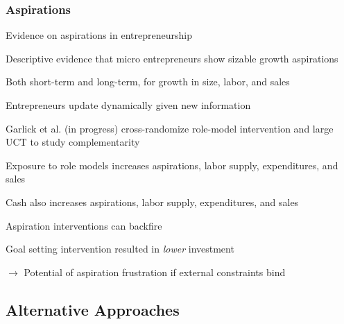 \documentclass[hideothersubsections, usenames,dvipsnames,11pt]{beamer}
\newenvironment{itemize_2pt}{\itemize\addtolength{\itemsep}{2pt}}{\enditemize}
\begin{document}
\begin{frame}
\frametitle{Aspirations}

Evidence on aspirations in entrepreneurship
\begin{itemize_2pt}
	\item Descriptive evidence that micro entrepreneurs show \textcolor{bdf}{sizable growth aspirations} \citep{Dalton2018}
	\begin{itemize_2pt}
		\item Both short-term and long-term, for growth in size, labor, and sales
		\item Entrepreneurs update dynamically given new information
	\end{itemize_2pt}
	
	\pause
	
	\item \textcolor{camel}{Garlick et al. (in progress)} cross-randomize role-model intervention and large UCT to study complementarity
	\begin{itemize_2pt}
		\item \textcolor{bdf}{Exposure to role models increases aspirations, labor supply, expenditures, and sales}
		\item Cash also increases aspirations, labor supply, expenditures, and sales
	\end{itemize_2pt}
	
	\pause
	
	\item Aspiration interventions can backfire
	\begin{itemize_2pt}
		\item Goal setting intervention resulted in \textit{lower} investment \citep{McKenzie2021a}
		\item[] $\rightarrow$ Potential of aspiration frustration if external constraints bind 
		\item[] \quad \citep[see also,][]{Galiani2018}
	\end{itemize_2pt}

\end{itemize_2pt}
\end{frame}


\subsection{Alternative Approaches}
\end{document}
